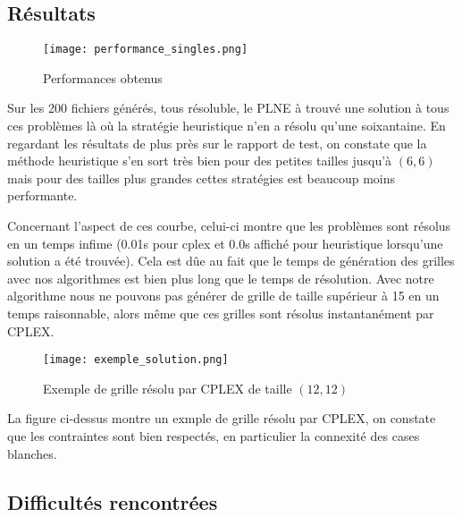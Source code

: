\documentclass[a4paper,12pt,titlepage,leqno]{article}
\begin{document}
\subsection{Résultats}

\begin{figure}[!ht]
\centering
\texttt{[image: performance\_singles.png]}
\caption{Performances obtenus}
\end{figure}

Sur les 200 fichiers générés, tous résoluble, le PLNE à trouvé une solution à tous ces problèmes là où la stratégie heuristique n'en a résolu qu'une soixantaine. En regardant les résultats de plus près sur le rapport de test, on constate que la méthode heuristique s'en sort très bien pour des petites tailles jusqu'à $(6,6)$ mais pour des tailles plus grandes cettes stratégies est beaucoup moins performante.
\par
Concernant l'aspect de ces courbe, celui-ci montre que les problèmes sont résolus en un temps infime (0.01s pour cplex et 0.0s affiché pour heuristique lorsqu'une solution a été trouvée). Cela est dûe au fait que le temps de génération des grilles avec nos algorithmes est bien plus long que le temps de résolution. Avec notre algorithme nous ne pouvons pas générer de grille de taille supérieur à 15 en un temps raisonnable, alors même que ces grilles sont résolus instantanément par CPLEX.

\begin{figure}[!ht]
\centering
\texttt{[image: exemple\_solution.png]}
\caption{Exemple de grille résolu par CPLEX de taille $(12,12)$}
\end{figure}

La figure ci-dessus montre un exmple de grille résolu par CPLEX, on constate que les contraintes sont bien respectés, en particulier la connexité des cases blanches.




\subsection{Difficultés rencontrées}
\end{document}
